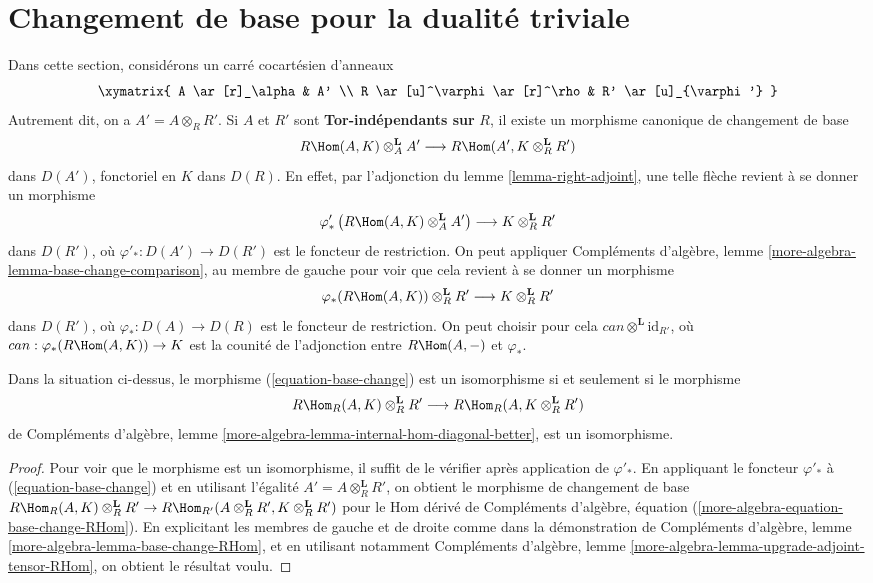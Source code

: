 \section{Changement de base pour la dualité triviale}
\label{section-base-change-trivial-duality}

\noindent
Dans cette section, considérons un carré cocartésien d'anneaux
$$
\xymatrix{
A \ar[r]_\alpha & A' \\
R \ar[u]^\varphi \ar[r]^\rho & R' \ar[u]_{\varphi'}
}
$$
Autrement dit, on a $A' = A \otimes_R R'$. Si $A$ et $R'$
sont {\bf Tor-indépendants sur} $R$,
il existe un morphisme canonique de changement de base
\begin{equation}
\label{equation-base-change}
R\Hom(A, K) \otimes_A^\mathbf{L} A'
\longrightarrow
R\Hom(A', K \otimes_R^\mathbf{L} R')
\end{equation}
dans $D(A')$, fonctoriel en $K$ dans $D(R)$.
En effet, par l'adjonction du lemme \ref{lemma-right-adjoint},
une telle flèche revient à se donner un morphisme
$$
\varphi'_*\left(R\Hom(A, K) \otimes_A^\mathbf{L} A'\right)
\longrightarrow
K \otimes_R^\mathbf{L} R'
$$
dans $D(R')$, où $\varphi'_* : D(A') \to D(R')$ est le foncteur de restriction.
On peut appliquer Compléments d'algèbre, lemme \ref{more-algebra-lemma-base-change-comparison},
au membre de gauche pour voir que cela revient à se donner un morphisme
$$
\varphi_*(R\Hom(A, K)) \otimes_R^\mathbf{L} R'
\longrightarrow
K \otimes_R^\mathbf{L} R'
$$
dans $D(R')$, où $\varphi_* : D(A) \to D(R)$ est le foncteur de restriction.
On peut choisir pour cela $can \otimes^\mathbf{L} \text{id}_{R'}$,
où $can : \varphi_*(R\Hom(A, K)) \to K$ est la counité de l'adjonction entre $R\Hom(A, -)$ et $\varphi_*$.

\begin{lemma}
\label{lemma-check-base-change-is-iso}
Dans la situation ci-dessus, le morphisme (\ref{equation-base-change})
est un isomorphisme si et seulement si le morphisme
$$
R\Hom_R(A, K) \otimes_R^\mathbf{L} R'
\longrightarrow
R\Hom_R(A, K \otimes_R^\mathbf{L} R')
$$
de Compléments d'algèbre, lemme \ref{more-algebra-lemma-internal-hom-diagonal-better}, est un isomorphisme.
\end{lemma}

\begin{proof}
Pour voir que le morphisme est un isomorphisme, il suffit de le vérifier
après application de $\varphi'_*$.
En appliquant le foncteur $\varphi'_*$ à (\ref{equation-base-change})
et en utilisant l'égalité $A' = A \otimes_R^\mathbf{L} R'$, on obtient le morphisme de changement de base
$R\Hom_R(A, K) \otimes_R^\mathbf{L} R' \to
R\Hom_{R'}(A \otimes_R^\mathbf{L} R', K \otimes_R^\mathbf{L} R')$
pour le Hom dérivé de Compléments d'algèbre, équation (\ref{more-algebra-equation-base-change-RHom}).
En explicitant les membres de gauche et de droite comme dans la démonstration
de Compléments d'algèbre, lemme \ref{more-algebra-lemma-base-change-RHom}, et en utilisant notamment
Compléments d'algèbre, lemme \ref{more-algebra-lemma-upgrade-adjoint-tensor-RHom}, on obtient le résultat voulu.
\end{proof}

